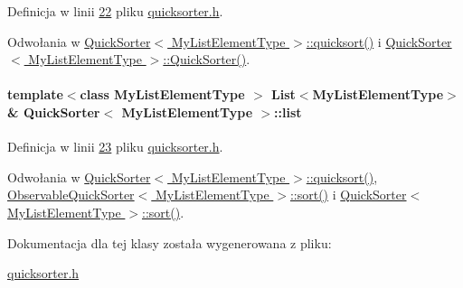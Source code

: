 Definicja w linii \hyperlink{quicksorter_8h_source_l00022}{22} pliku \hyperlink{quicksorter_8h_source}{quicksorter.\-h}.



Odwołania w \hyperlink{quicksorter_8h_source_l00036}{Quick\-Sorter$<$ My\-List\-Element\-Type $>$\-::quicksort()} i \hyperlink{quicksorter_8h_source_l00027}{Quick\-Sorter$<$ My\-List\-Element\-Type $>$\-::\-Quick\-Sorter()}.

\hypertarget{class_quick_sorter_a60a7a4772c958f256962294418e83fe4}{
\paragraph[{list}]{\setlength{\rightskip}{0pt plus 5cm}template$<$class My\-List\-Element\-Type $>$ {\bf List}$<$My\-List\-Element\-Type$>$\& {\bf Quick\-Sorter}$<$ My\-List\-Element\-Type $>$\-::list}}\label{class_quick_sorter_a60a7a4772c958f256962294418e83fe4}


Definicja w linii \hyperlink{quicksorter_8h_source_l00023}{23} pliku \hyperlink{quicksorter_8h_source}{quicksorter.\-h}.



Odwołania w \hyperlink{quicksorter_8h_source_l00036}{Quick\-Sorter$<$ My\-List\-Element\-Type $>$\-::quicksort()}, \hyperlink{observablequicksorter_8h_source_l00023}{Observable\-Quick\-Sorter$<$ My\-List\-Element\-Type $>$\-::sort()} i \hyperlink{quicksorter_8h_source_l00061}{Quick\-Sorter$<$ My\-List\-Element\-Type $>$\-::sort()}.



Dokumentacja dla tej klasy została wygenerowana z pliku\-:\begin{DoxyCompactItemize}
\item 
\hyperlink{quicksorter_8h}{quicksorter.\-h}\end{DoxyCompactItemize}
